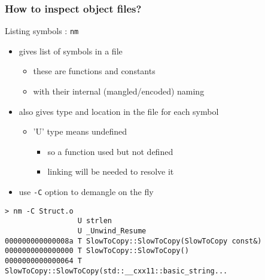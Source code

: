 \begin{frame}[fragile]
  \frametitle{How to inspect object files?}
  \begin{block}{Listing symbols : \texttt{nm}}
    \begin{itemize}
    \item gives list of symbols in a file
      \begin{itemize}
      \item these are functions and constants
      \item with their internal (mangled/encoded) naming
      \end{itemize}
    \item also gives type and location in the file for each symbol
      \begin{itemize}
      \item 'U' type means undefined
        \begin{itemize}
        \item so a function used but not defined
        \item linking will be needed to resolve it
        \end{itemize}
      \end{itemize}
    \item use \texttt{-C} option to demangle on the fly
    \end{itemize}
  \end{block}
  \small
  \begin{verbatim}
> nm -C Struct.o
                 U strlen
                 U _Unwind_Resume
000000000000008a T SlowToCopy::SlowToCopy(SlowToCopy const&)
0000000000000000 T SlowToCopy::SlowToCopy()
0000000000000064 T SlowToCopy::SlowToCopy(std::__cxx11::basic_string...
  \end{verbatim}
\end{frame}

